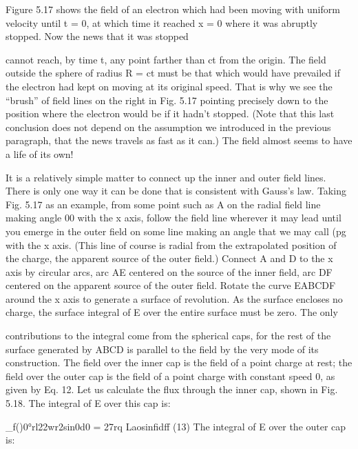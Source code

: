 Figure 5.17 shows the field of an electron which had been moving
with uniform velocity until t = 0, at which time it reached x = 0
where it was abruptly stopped. Now the news that it was stopped

  

cannot reach, by time t, any point farther than ct from the origin.
The field outside the sphere of radius R = ct must be that which
would have prevailed if the electron had kept on moving at its original
speed. That is why we see the ``brush'' of field lines on the right
in Fig. 5.17 pointing precisely down to the position where the electron
would be if it hadn't stopped. (Note that this last conclusion
does not depend on the assumption we introduced in the previous
paragraph, that the news travels as fast as it can.) The field almost
seems to have a life of its own!

It is a relatively simple matter to connect up the inner and outer
field lines. There is only one way it can be done that is consistent
with Gauss's law. Taking Fig. 5.17 as an example, from some point
such as A on the radial field line making angle 00 with the x axis,
follow the field line wherever it may lead until you emerge in the
outer field on some line making an angle that we may call (pg with
the x axis. (This line of course is radial from the extrapolated position
of the charge, the apparent source of the outer field.) Connect
A and D to the x axis by circular arcs, arc AE centered on the source
of the inner field, arc DF centered on the apparent source of the
outer field. Rotate the curve EABCDF around the x axis to generate
a surface of revolution. As the surface encloses no charge, the surface
integral of E over the entire surface must be zero. The only

 

contributions to the integral come from the spherical caps, for the
rest of the surface generated by ABCD is parallel to the field by the
very mode of its construction. The field over the inner cap is the
field of a point charge at rest; the field over the outer cap is the field
of a point charge with constant speed 0, as given by Eq. 12. Let us
calculate the flux through the inner cap, shown in Fig. 5.18. The
integral of E over this cap is:

\begin{equation}
\end{equation}
_f()0°rl22wr2sin0d0 = 27rq Laosinfidff (13)
The integral of E over the outer cap is:

